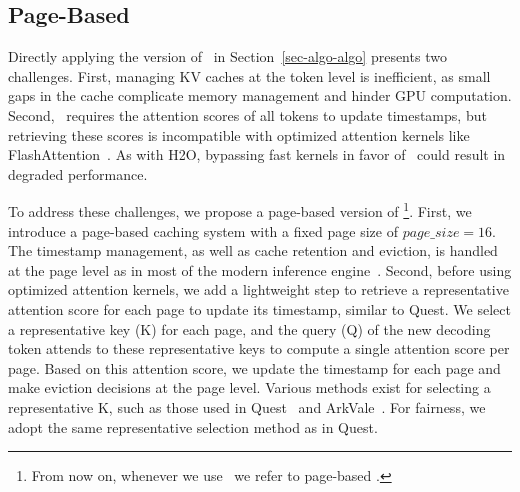 \subsection{Page-Based \algo}


Directly applying the version of \algo\ in Section~\ref{sec-algo-algo} presents two challenges. First, managing KV caches at the token level is inefficient, as small gaps in the cache complicate memory management and hinder GPU computation. Second, \algo\ requires the attention scores of all tokens to update timestamps, but retrieving these scores is incompatible with optimized attention kernels like FlashAttention~\cite{dao2022flashattention, dao2024flashattention2}. As with H2O, bypassing fast kernels in favor of \algo\ could result in degraded performance.

To address these challenges, we propose a page-based version of \algo\footnote{From now on, whenever we use \algo\, we refer to page-based \algo.}. First, we introduce a page-based caching system with a fixed page size of $page\_size = 16$. The timestamp management, as well as cache retention and eviction, is handled at the page level as in most of the modern inference engine~\cite{woosuk2023vllm, lianmin2024sglang}. Second, before using optimized attention kernels, we add a lightweight step to retrieve a representative attention score for each page to update its timestamp, similar to Quest. We select a representative key (K) for each page, and the query (Q) of the new decoding token attends to these representative keys to compute a single attention score per page. Based on this attention score, we update the timestamp for each page and make eviction decisions at the page level. Various methods exist for selecting a representative K, such as those used in Quest~\cite{tang2024quest} and ArkVale~\cite{chenarkvale}. For fairness, we adopt the same representative selection method as in Quest.